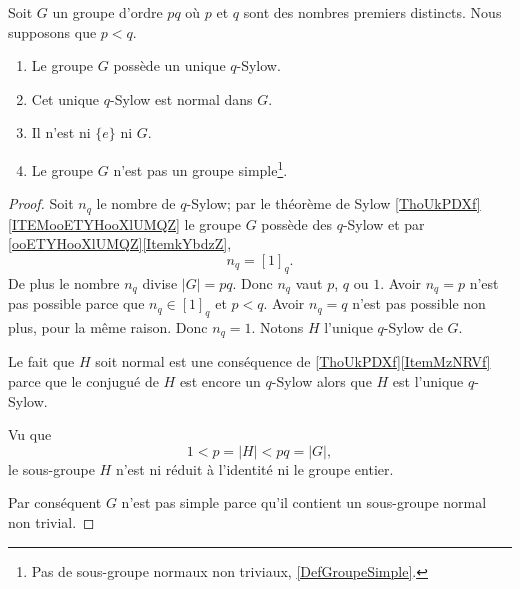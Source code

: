 \begin{lemma}
    Soit \( G\) un groupe d'ordre \( pq\) où \( p\) et \( q\) sont des nombres premiers distincts. Nous supposons que \( p<q\).    
    \begin{enumerate}
        \item
            Le groupe \( G\) possède un unique \( q\)-Sylow.
        \item
            Cet unique \( q\)-Sylow est normal dans \( G\).
        \item
            Il n'est ni \( \{ e \}\) ni \( G\).
        \item
            Le groupe \( G\) n'est pas un groupe simple\footnote{Pas de sous-groupe normaux non triviaux, \ref{DefGroupeSimple}.}.
    \end{enumerate}
\end{lemma}

\begin{proof}
    Soit \( n_q\) le nombre de \( q\)-Sylow; par le théorème de Sylow \ref{ThoUkPDXf}\ref{ITEMooETYHooXlUMQZ} le groupe \( G\) possède des \( q\)-Sylow et par \ref{ooETYHooXlUMQZ}\ref{ItemkYbdzZ},
    \begin{equation}
        n_q=[1]_q.
    \end{equation}
    De plus le nombre \( n_q\) divise \( | G |=pq\). Donc \( n_q\) vaut \( p\), \( q\) ou \( 1\). Avoir \( n_q=p\) n'est pas possible parce que \( n_q\in[1]_q\) et \( p<q\). Avoir \( n_q=q\) n'est pas possible non plus, pour la même raison. Donc \( n_q=1\). Notons \( H\) l'unique \( q\)-Sylow de \( G\).

    Le fait que \( H\) soit normal est une conséquence de \ref{ThoUkPDXf}\ref{ItemMzNRVf} parce que le conjugué de \( H\) est encore un \( q\)-Sylow alors que \( H\) est l'unique \( q\)-Sylow. 

    Vu que
    \begin{equation}
        1<p=| H |<pq=| G |,
    \end{equation}
    le sous-groupe \( H \) n'est ni réduit à l'identité ni le groupe entier.

    Par conséquent \( G\) n'est pas simple parce qu'il contient un sous-groupe normal non trivial.
\end{proof}

